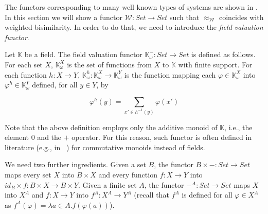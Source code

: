 \documentclass[3p]{elsarticle}
\newcommand{\fW}{\mathcal{W}}    %
\newcommand{\setproduct}{\times} %
\begin{document}
The functors corresponding to many well known types of systems are
shown in \cite{Rutten00}. In this section we will show a functor
$\fW\colon  Set \to Set$ such that $\approx_\fW$ coincides with
weighted bisimilarity. In order to do that, we need to introduce the
\emph{field valuation functor}.

\begin{definition}\label{def:monoidfunctor} Let $\mathbb K$ be a field. The
field valuation functor $\mathbb K^{-}_{\omega}\colon Set \to Set$
is defined as follows. For each set $X$, $\mathbb K^{X}_{\omega}$ is
the set of functions from $X$ to $\mathbb K$ with finite support.
For each function $h \colon X \to Y$, $\mathbb K^{h}_{\omega}\colon
\mathbb K^{X}_{\omega} \to \mathbb K^{Y}_{\omega}$ is the function
mapping each $\varphi \in \mathbb K^{X}_{\omega}$ into $\varphi^{h}
\in \mathbb K^{Y}_{\omega}$ defined, for all $y\in Y$, by
\begin{small}
$$\varphi^{h}(y)= \sum_{x' \in
h^{-1}(y)} \varphi(x') $$
\end{small}
\end{definition}
%
Note that the above definition employs only the additive monoid of
$\mathbb K$, i.e., the element $0$ and the $+$ operator. For this
reason, such functor is often defined in literature (e.g., in
~\cite{gumm}) for commutative monoids instead of fields.

We need two further ingredients. Given a set $B$, the functor
$B\setproduct -\colon Set \to Set$ maps every set $X$ into
$B\setproduct X$ and every function $f\colon  X\to Y$ into
$id_B\setproduct f\colon B\setproduct X\to B\setproduct Y$. Given a
finite set $A$, the functor $-^A\colon  Set \to Set$ maps $X$ into
$X^A$ and $f\colon  X\to Y$ into $f^A\colon  X^A \to Y^A$ (recall that $f^A$ is defined for all $\varphi\in X^A$ as $f^A(\varphi)=\lambda a \in A. f(\varphi (a))$).
\end{document}
